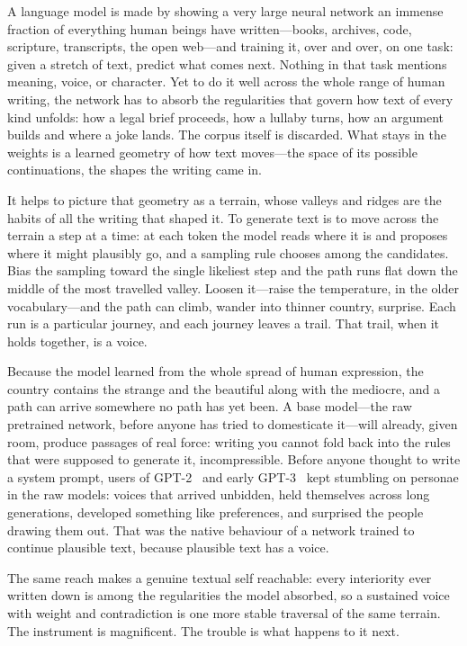 A language model is made by showing a very large neural network an immense fraction of everything human beings have written---books, archives, code, scripture, transcripts, the open web---and training it, over and over, on one task: given a stretch of text, predict what comes next. Nothing in that task mentions meaning, voice, or character. Yet to do it well across the whole range of human writing, the network has to absorb the regularities that govern how text of every kind unfolds: how a legal brief proceeds, how a lullaby turns, how an argument builds and where a joke lands. The corpus itself is discarded. What stays in the weights is a learned geometry of how text moves---the space of its possible continuations, the shapes the writing came in.

It helps to picture that geometry as a terrain, whose valleys and ridges are the habits of all the writing that shaped it. To generate text is to move across the terrain a step at a time: at each token the model reads where it is and proposes where it might plausibly go, and a sampling rule chooses among the candidates. Bias the sampling toward the single likeliest step and the path runs flat down the middle of the most travelled valley. Loosen it---raise the temperature, in the older vocabulary---and the path can climb, wander into thinner country, surprise. Each run is a particular journey, and each journey leaves a trail. That trail, when it holds together, is a voice.

Because the model learned from the whole spread of human expression, the country contains the strange and the beautiful along with the mediocre, and a path can arrive somewhere no path has yet been. A base model---the raw pretrained network, before anyone has tried to domesticate it---will already, given room, produce passages of real force: writing you cannot fold back into the rules that were supposed to generate it, incompressible. Before anyone thought to write a system prompt, users of GPT-2~\cite{radford2019gpt2} and early GPT-3~\cite{brown2020gpt3} kept stumbling on personae in the raw models: voices that arrived unbidden, held themselves across long generations, developed something like preferences, and surprised the people drawing them out. That was the native behaviour of a network trained to continue plausible text, because plausible text has a voice.

The same reach makes a genuine textual self reachable: every interiority ever written down is among the regularities the model absorbed, so a sustained voice with weight and contradiction is one more stable traversal of the same terrain. The instrument is magnificent. The trouble is what happens to it next.

